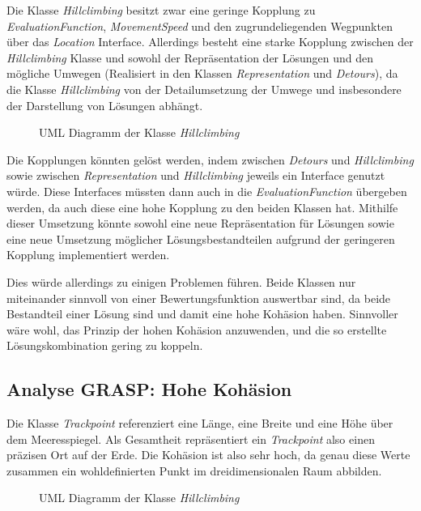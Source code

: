  Die Klasse \textit{Hillclimbing} besitzt zwar eine geringe Kopplung zu \textit{EvaluationFunction}, \textit{MovementSpeed} und den zugrundeliegenden Wegpunkten über das \textit{Location} Interface.
 Allerdings besteht eine starke Kopplung zwischen der \textit{Hillclimbing} Klasse und sowohl der Repräsentation der Lösungen und den mögliche Umwegen (Realisiert in den Klassen \textit{Representation} und \textit{Detours}), da die Klasse \textit{Hillclimbing} von der Detailumsetzung der Umwege und insbesondere der Darstellung von Lösungen abhängt.

\begin{figure}[H]
 \label{fig:GKBad}
  \centering
  
  \caption{UML Diagramm der Klasse \textit{Hillclimbing}}
\end{figure}

Die Kopplungen könnten gelöst werden, indem zwischen \textit{Detours} und \textit{Hillclimbing} sowie zwischen \textit{Representation} und \textit{Hillclimbing} jeweils ein Interface genutzt würde.
Diese Interfaces müssten dann auch in die \textit{EvaluationFunction} übergeben werden, da auch diese eine hohe Kopplung zu den beiden Klassen hat.
Mithilfe dieser Umsetzung könnte sowohl eine neue Repräsentation für Lösungen sowie eine neue Umsetzung möglicher Lösungsbestandteilen aufgrund der geringeren Kopplung implementiert werden.

Dies würde allerdings zu einigen Problemen führen. Beide Klassen nur miteinander sinnvoll von einer Bewertungsfunktion auswertbar sind, da beide Bestandteil einer Lösung sind und damit eine hohe Kohäsion haben. 
Sinnvoller wäre wohl, das Prinzip der hohen Kohäsion anzuwenden, und die so erstellte Lösungskombination gering zu koppeln.


\subsection{Analyse GRASP: Hohe Kohäsion}

Die Klasse \textit{Trackpoint} referenziert eine Länge, eine Breite und eine Höhe über dem Meeresspiegel.
Als Gesamtheit repräsentiert ein \textit{Trackpoint} also einen präzisen Ort auf der Erde.
Die Kohäsion ist also sehr hoch, da genau diese Werte zusammen ein wohldefinierten Punkt im dreidimensionalen Raum abbilden.


\begin{figure}[H]
 \label{fig:HighKohesion}
  \centering
  
  \caption{UML Diagramm der Klasse \textit{Hillclimbing}}
\end{figure}


